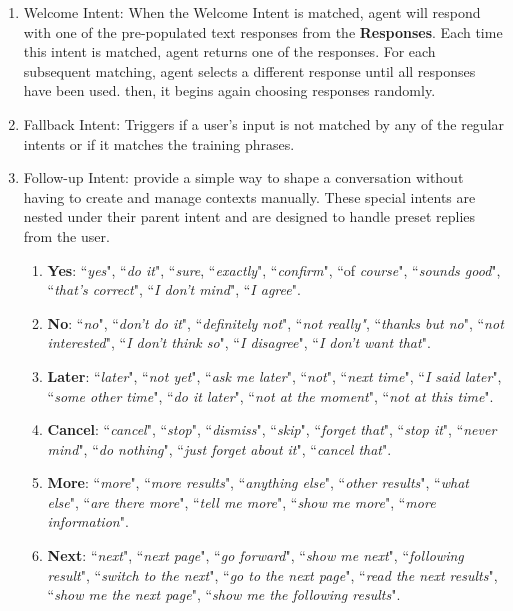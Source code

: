 \documentclass{scrreprt}
\begin{document}
\begin{enumerate}
    \item Welcome Intent: When the Welcome Intent is matched, agent will respond with one of the pre-populated text responses from the \textbf{Responses}. Each time this intent is matched, agent returns one of the responses. For each subsequent matching, agent selects a different response until all responses have been used. then, it begins again choosing responses randomly.
    
    \item Fallback Intent: Triggers if a user's input is not matched by any of the regular intents or if it matches the training phrases.
    \item Follow-up Intent: provide a simple way to shape a conversation without having to create and manage contexts manually. These special intents are nested under their parent intent and are designed to handle preset replies from the user.
    \begin{enumerate}
        \item \textbf{Yes}: ``\textit{yes}", ``\textit{do it}", ``\textit{sure}, ``\textit{exactly}", ``\textit{confirm}", ``of \textit{course}", ``\textit{sounds good}", ``\textit{that's correct}", ``\textit{I don't mind}", ``\textit{I agree}".
        \item \textbf{No}: ``\textit{no}", ``\textit{don't do it}", ``\textit{definitely not}", ``\textit{not really"}, ``\textit{thanks but no}", ``\textit{not interested}", ``\textit{I don't think so}", ``\textit{I disagree}", ``\textit{I don't want that}".
        \item \textbf{Later}: ``\textit{later}", ``\textit{not yet}", ``\textit{ask me later}", ``\textit{not}", ``\textit{next time}", ``\textit{I said later}", ``\textit{some other time}", ``\textit{do it later}", ``\textit{not at the moment}", ``\textit{not at this time}".
        \item \textbf{Cancel}: ``\textit{cancel}", ``\textit{stop}", ``\textit{dismiss}", ``\textit{skip}", ``\textit{forget that}", ``\textit{stop it}", ``\textit{never mind}", ``\textit{do nothing}", ``\textit{just forget about it}", ``\textit{cancel that}".
        \item \textbf{More}: ``\textit{more}", ``\textit{more results}", ``\textit{anything else}", ``\textit{other results}", ``\textit{what else}", ``\textit{are there more}", ``\textit{tell me more}", ``\textit{show me more}", ``\textit{more information}".
        \item \textbf{Next}: ``\textit{next}", ``\textit{next page}", ``\textit{go forward}", ``\textit{show me next}", ``\textit{following result}", ``\textit{switch to the next}", ``\textit{go to the next page}", ``\textit{read the next results}", ``\textit{show me the next page}", ``\textit{show me the following results}".

\end{enumerate}
\end{enumerate}
\end{document}
